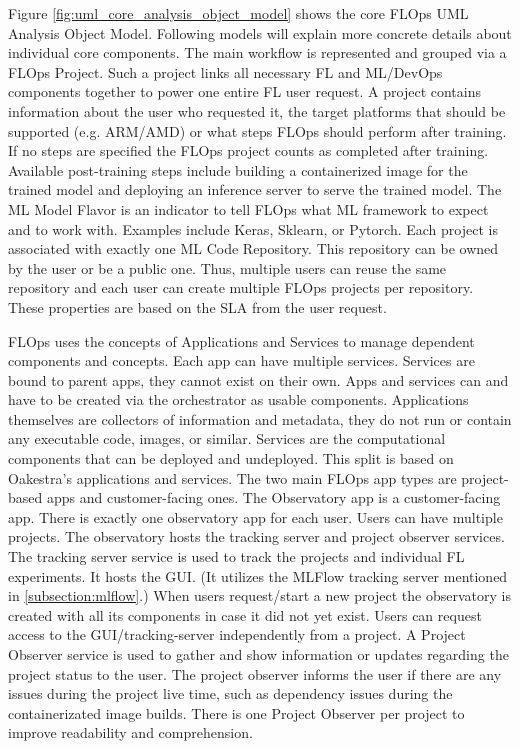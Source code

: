 Figure \ref{fig:uml_core_analysis_object_model} shows the core FLOps UML Analysis Object Model.
Following models will explain more concrete details about individual core components. 
The main workflow is represented and grouped via a FLOps Project.
Such a project links all necessary FL and ML/DevOps components together to power one entire FL user request.
A project contains information about the user who requested it, the target platforms that should be supported (e.g. ARM/AMD) or what steps FLOps should perform after training.
If no steps are specified the FLOps project counts as completed after training.
Available post-training steps include building a containerized image for the trained model 
and deploying an inference server to serve the trained model.
The ML Model Flavor is an indicator to tell FLOps what ML framework to expect and to work with.
Examples include Keras, Sklearn, or Pytorch.
Each project is associated with exactly one ML Code Repository.
This repository can be owned by the user or be a public one.
Thus, multiple users can reuse the same repository and each user can create multiple FLOps projects per repository.
These properties are based on the SLA from the user request. 

FLOps uses the concepts of Applications and Services to manage dependent components and concepts.
Each app can have multiple services.
Services are bound to parent apps, they cannot exist on their own.
Apps and services can and have to be created via the orchestrator as usable components.
Applications themselves are collectors of information and metadata, they do not run or contain any executable code, images, or similar.
Services are the computational components that can be deployed and undeployed.
This split is based on Oakestra's applications and services.
The two main FLOps app types are project-based apps and customer-facing ones.
The Observatory app is a customer-facing app.
There is exactly one observatory app for each user.
Users can have multiple projects.
The observatory hosts the tracking server and project observer services.
The tracking server service is used to track the projects and individual FL experiments.
It hosts the GUI. 
(It utilizes the MLFlow tracking server mentioned in \ref{subsection:mlflow}.)
When users request/start a new project the observatory is created with all its components in case it did not yet exist.
Users can request access to the GUI/tracking-server independently from a project.
A Project Observer service is used to gather and show information or updates regarding the project status to the user.
The project observer informs the user if there are any issues during the project live time, such as dependency issues during the containerizated image builds.
There is one Project Observer per project to improve readability and comprehension.

